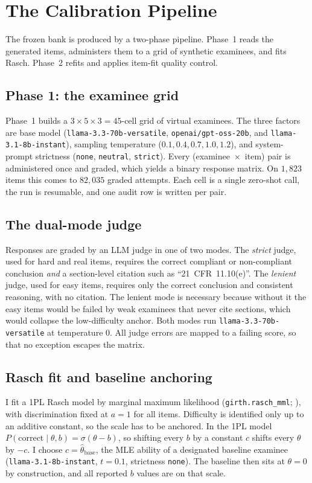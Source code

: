 \section{The Calibration Pipeline}
\label{sec:pipeline}

The frozen bank is produced by a two-phase pipeline. Phase~1 reads the
generated items, administers them to a grid of synthetic examinees, and
fits Rasch. Phase~2 refits and applies item-fit quality control.

\subsection{Phase 1: the examinee grid}
Phase~1 builds a $3 \times 5 \times 3 = 45$-cell grid of virtual
examinees. The three factors are base model
(\texttt{llama-3.3-70b-versatile}, \texttt{openai/gpt-oss-20b}, and
\texttt{llama-3.1-8b-instant}), sampling temperature
($0.1, 0.4, 0.7, 1.0, 1.2$), and system-prompt strictness
(\texttt{none}, \texttt{neutral}, \texttt{strict}). Every
(examinee~$\times$~item) pair is administered once and graded, which
yields a binary response matrix. On $1{,}823$ items this comes to
$82{,}035$ graded attempts. Each cell is a single zero-shot call, the run
is resumable, and one audit row is written per pair.

\subsection{The dual-mode judge}
Responses are graded by an LLM judge in one of two modes. The
\emph{strict} judge, used for hard and real items, requires the correct
compliant or non-compliant conclusion \emph{and} a section-level citation
such as ``21~CFR~11.10(e)''. The \emph{lenient} judge, used for easy
items, requires only the correct conclusion and consistent reasoning,
with no citation. The lenient mode is necessary because without it the
easy items would be failed by weak examinees that never cite sections,
which would collapse the low-difficulty anchor. Both modes run
\texttt{llama-3.3-70b-versatile} at temperature $0$. All judge errors are
mapped to a failing score, so that no exception escapes the matrix.

\subsection{Rasch fit and baseline anchoring}
I fit a 1PL Rasch model by marginal maximum likelihood
(\texttt{girth.rasch\_mml}; \citealp{girth}), with discrimination fixed
at $a = 1$ for all items. Difficulty is identified only up to an additive constant, so the
scale has to be anchored. In the 1PL model
$P(\text{correct}\mid\theta,b)=\sigma(\theta-b)$, so shifting every $b$
by a constant $c$ shifts every $\theta$ by $-c$. I choose
$c = \hat{\theta}_{\text{base}}$, the MLE ability of a designated
baseline examinee (\texttt{llama-3.1-8b-instant}, $t{=}0.1$, strictness
\texttt{none}). The baseline then sits at $\theta = 0$ by construction,
and all reported $b$ values are on that scale.

